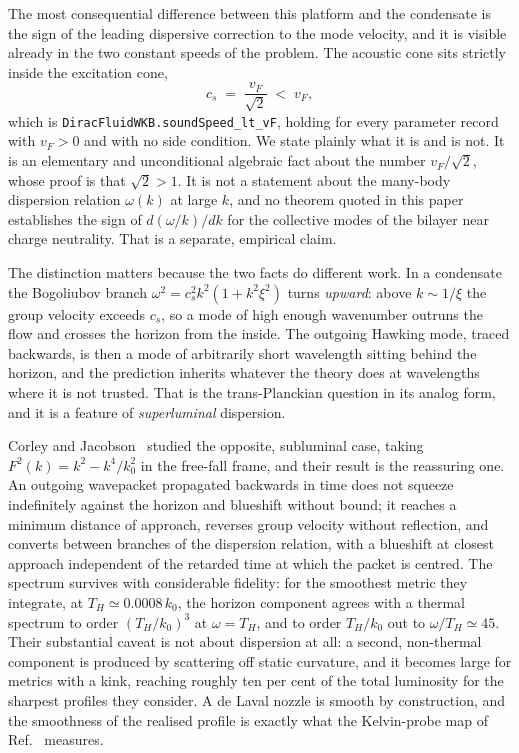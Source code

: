\documentclass[aps,prd,reprint,nofootinbib,superscriptaddress]{revtex4-2}
\begin{document}
The most consequential difference between this platform and the
condensate is the sign of the leading dispersive correction to the mode
velocity, and it is visible already in the two constant speeds of the
problem. The acoustic cone sits strictly inside the excitation cone,
\begin{equation}
c_s \;=\; \frac{v_F}{\sqrt 2} \;<\; v_F ,
\label{eq:subluminal}
\end{equation}
which is \texttt{DiracFluidWKB.soundSpeed\_lt\_vF}, holding for every
parameter record with $v_F > 0$ and with no side condition. We state
plainly what it is and is not. It is an elementary and unconditional
algebraic fact about the number $v_F/\sqrt 2$, whose proof is that
$\sqrt 2 > 1$. It is not a statement about the many-body dispersion
relation $\omega(k)$ at large $k$, and no theorem quoted in this paper
establishes the sign of $d(\omega/k)/dk$ for the collective modes of the
bilayer near charge neutrality. That is a separate, empirical claim.

The distinction matters because the two facts do different work. In a
condensate the Bogoliubov branch
$\omega^2 = c_s^2 k^2 (1 + k^2\xi^2)$ turns \emph{upward}: above
$k \sim 1/\xi$ the group velocity exceeds $c_s$, so a mode of high enough
wavenumber outruns the flow and crosses the horizon from the inside. The
outgoing Hawking mode, traced backwards, is then a mode of arbitrarily
short wavelength sitting behind the horizon, and the prediction inherits
whatever the theory does at wavelengths where it is not trusted. That is
the trans-Planckian question in its analog form, and it is a feature of
\emph{superluminal} dispersion.

Corley and Jacobson~\cite{CorleyJacobson1996} studied the opposite,
subluminal case, taking $F^2(k) = k^2 - k^4/k_0^2$ in the free-fall
frame, and their result is the reassuring one. An outgoing wavepacket
propagated backwards in time does not squeeze indefinitely against the
horizon and blueshift without bound; it reaches a minimum distance of
approach, reverses group velocity without reflection, and converts
between branches of the dispersion relation, with a blueshift at closest
approach independent of the retarded time at which the packet is
centred. The spectrum survives with considerable fidelity: for the
smoothest metric they integrate, at $T_H \simeq 0.0008\,k_0$, the horizon
component agrees with a thermal spectrum to order $(T_H/k_0)^3$ at
$\omega = T_H$, and to order $T_H/k_0$ out to $\omega/T_H \simeq 45$.
Their substantial caveat is not about dispersion at all: a second,
non-thermal component is produced by scattering off static curvature, and
it becomes large for metrics with a kink, reaching roughly ten per cent
of the total luminosity for the sharpest profiles they consider. A de
Laval nozzle is smooth by construction, and the smoothness of the
realised profile is exactly what the Kelvin-probe map of
Ref.~\cite{Geurs2025} measures.
\end{document}
